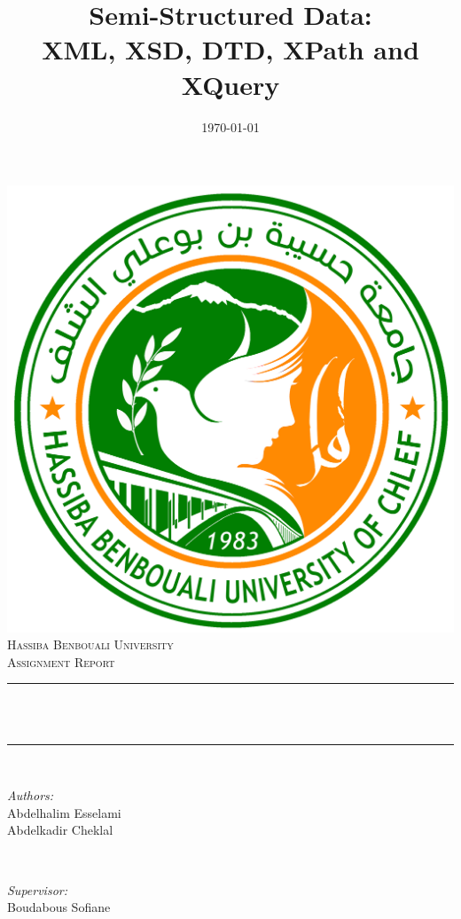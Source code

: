 \documentclass[12pt]{report}
\date{\today}
\title{\Large Semi-Structured Data: \\ XML, XSD, DTD, XPath and XQuery}
\begin{document}
\begin{titlepage}
    \centering
    \vspace*{0.5cm}
    \includegraphics[scale=0.2]{university-logo.png}\\[1.0cm]	
    \textsc{\LARGE Hassiba Benbouali University}\\[2.0cm]	
	\textsc{\Large Assignment Report}\\[0.5cm]				
	\rule{\linewidth}{0.2mm} \\[0.4cm]
	{\huge \bfseries \thetitle \\[0.4cm] }
	\rule{\linewidth}{0.2mm} \\[1.5cm]
	
	\begin{minipage}{0.4\textwidth}
		\begin{flushleft} \large
			\emph{Authors:}\\
			Abdelhalim Esselami \\
			Abdelkadir Cheklal
		\end{flushleft}
	\end{minipage}~
	\begin{minipage}{0.4\textwidth}
		\begin{flushright} \large
			\emph{Supervisor:} \\
			Boudabous Sofiane							
		\end{flushright}
	\end{minipage}\\[2cm]
	
	{\large \thedate}\\[2cm]
	
	\vfill
\end{titlepage}
\end{document}
